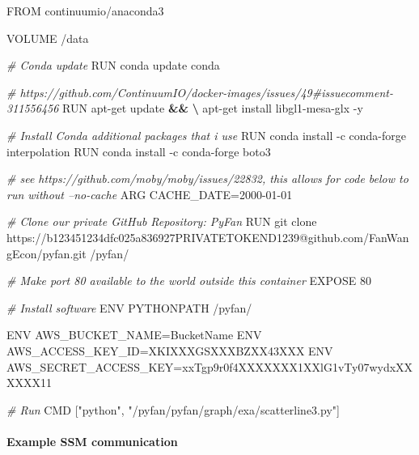 \documentclass[
]{book}
\newenvironment{Shaded}{\begin{snugshade}}{\end{snugshade}}
\newcommand{\CommentTok}[1]{\textcolor[rgb]{0.56,0.35,0.01}{\textit{#1}}}
\newcommand{\ExtensionTok}[1]{#1}
\newcommand{\KeywordTok}[1]{\textcolor[rgb]{0.13,0.29,0.53}{\textbf{#1}}}
\newcommand{\NormalTok}[1]{#1}
\newcommand{\StringTok}[1]{\textcolor[rgb]{0.31,0.60,0.02}{#1}}
\begin{document}
\begin{Shaded}
\begin{Highlighting}[]
\ExtensionTok{FROM}\NormalTok{ continuumio/anaconda3}

\ExtensionTok{VOLUME}\NormalTok{ /data}

\CommentTok{# Conda update}
\ExtensionTok{RUN}\NormalTok{ conda update conda}

\CommentTok{# https://github.com/ContinuumIO/docker-images/issues/49#issuecomment-311556456}
\ExtensionTok{RUN}\NormalTok{ apt-get update }\KeywordTok{&&} \KeywordTok{\textbackslash{}}
    \ExtensionTok{apt-get}\NormalTok{ install libgl1-mesa-glx -y}

\CommentTok{# Install Conda additional packages that i use}
\ExtensionTok{RUN}\NormalTok{ conda install -c conda-forge interpolation}
\ExtensionTok{RUN}\NormalTok{ conda install -c conda-forge boto3}

\CommentTok{# see https://github.com/moby/moby/issues/22832, this allows for code below to run without --no-cache}
\ExtensionTok{ARG}\NormalTok{ CACHE_DATE=2000-01-01}

\CommentTok{# Clone our private GitHub Repository: PyFan}
\ExtensionTok{RUN}\NormalTok{ git clone https://b123451234dfc025a836927PRIVATETOKEND1239@github.com/FanWangEcon/pyfan.git /pyfan/}

\CommentTok{# Make port 80 available to the world outside this container}
\ExtensionTok{EXPOSE}\NormalTok{ 80}

\CommentTok{# Install software}
\ExtensionTok{ENV}\NormalTok{ PYTHONPATH /pyfan/}

\ExtensionTok{ENV}\NormalTok{ AWS_BUCKET_NAME=BucketName}
\ExtensionTok{ENV}\NormalTok{ AWS_ACCESS_KEY_ID=XKIXXXGSXXXBZXX43XXX}
\ExtensionTok{ENV}\NormalTok{ AWS_SECRET_ACCESS_KEY=xxTgp9r0f4XXXXXXX1XXlG1vTy07wydxXXXXXX11}

\CommentTok{# Run}
\ExtensionTok{CMD}\NormalTok{ [}\StringTok{"python"}\NormalTok{, }\StringTok{"/pyfan/pyfan/graph/exa/scatterline3.py"}\NormalTok{]}
\end{Highlighting}
\end{Shaded}

\hypertarget{example-ssm-communication}{%
\paragraph{Example SSM communication}\label{example-ssm-communication}}
\end{document}

